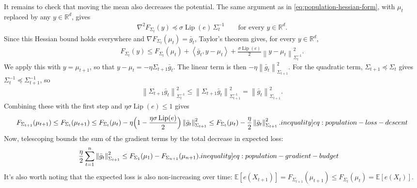 \documentclass[12pt,cleveref]{jmlr}
\newcommand{\ineqlabel}[1]{\label[inequality]{#1}}
\newcommand{\R}{\mathbb R}
\newcommand{\E}{\mathbb E}
\newcommand{\Lip}{\operatorname{Lip}}
\newcommand{\1}{\mathbf 1}
\newcommand{\ip}[2]{\left\langle #1,#2\right\rangle}
\newcommand{\normm}[2]{\left\lVert #1\right\rVert_{#2}}
\begin{document}
It remains to check that moving the mean also decreases the potential.
The same argument as in \cref{eq:population-hessian-form}, with $\mu_t$ replaced by any $y\in\R^d$, gives
\begin{align}
    \nabla^2F_{\Sigma_t}(y)\preceq\sigma\Lip(e)\,\Sigma_t^{-1}
    \qquad\text{for every }y\in\R^d.
\end{align}
Since this Hessian bound holds everywhere and $\nabla F_{\Sigma_t}(\mu_t)=\bar g_t$, Taylor's theorem gives, for every $y\in\R^d$,
\begin{align}
    F_{\Sigma_t}(y)
    \leq F_{\Sigma_t}(\mu_t)
    +\ip{\bar g_t}{y-\mu_t}
    +\frac{\sigma\Lip(e)}2\normm{y-\mu_t}{\Sigma_t^{-1}}^2.
\end{align}
We apply this with $y=\mu_{t+1}$, so that $y-\mu_t=-\eta\Sigma_{t+1}\bar g_t$.
The linear term is then $-\eta\normm{\bar g_t}{\Sigma_{t+1}}^2$.
For the quadratic term, $\Sigma_{t+1}\preceq\Sigma_t$ gives $\Sigma_t^{-1}\preceq\Sigma_{t+1}^{-1}$, so
\begin{align}
    \normm{\Sigma_{t+1}\bar g_t}{\Sigma_t^{-1}}^2
    \leq\normm{\Sigma_{t+1}\bar g_t}{\Sigma_{t+1}^{-1}}^2
    =\normm{\bar g_t}{\Sigma_{t+1}}^2.
\end{align}
Combining these with the first step and $\eta\sigma\Lip(e)\leq1$ gives
\begin{align}
    F_{\Sigma_{t+1}}(\mu_{t+1})
    \leq F_{\Sigma_t}(\mu_{t+1})
    \leq F_{\Sigma_t}(\mu_t)
    -\eta\Bigl(1-\frac{\eta\sigma\Lip(e)}2\Bigr)\normm{\bar g_t}{\Sigma_{t+1}}^2
    \leq F_{\Sigma_t}(\mu_t)
    -\frac\eta2\normm{\bar g_t}{\Sigma_{t+1}}^2.
    \ineqlabel{eq:population-loss-descent}
\end{align}
Now, telescoping bounds the sum of the gradient terms by the total decrease in expected loss:
\begin{align}
    \frac\eta2\sum_{t=1}^n\normm{\bar g_t}{\Sigma_{t+1}}^2
    & \leq F_{\Sigma_1}(\mu_1)
    -F_{\Sigma_{n+1}}(\mu_{n+1}).
    \ineqlabel{eq:population-gradient-budget}
\end{align}
It's also worth noting that the expected loss is also non-increasing over time:
$\E[e(X_{t+1})]=F_{\Sigma_{t+1}}(\mu_{t+1})\leq F_{\Sigma_t}(\mu_t)=\E[e(X_t)]$.
\end{document}

